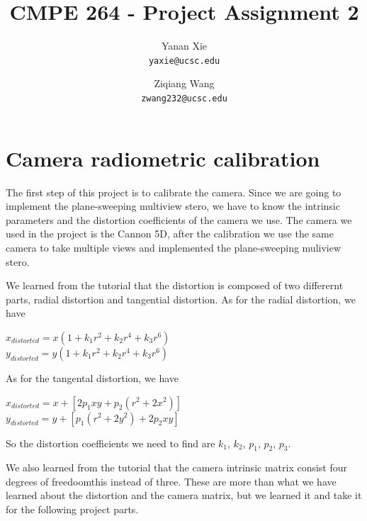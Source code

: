 \documentclass[10pt,twocolumn,letterpaper]{article}
\begin{document}
\title{CMPE 264 - Project Assignment 2}

\author{Yanan Xie\\
{\tt\small yaxie@ucsc.edu}
\and
Ziqiang Wang\\
{\tt\small zwang232@ucsc.edu}
}

\maketitle


\section{Camera radiometric calibration}
The first step of this project is to calibrate the camera. Since we are going to implement the plane-sweeping multiview stero, we have to know the intrinsic parameters and the distortion coefficients of the camera we use. The camera we used in the project is the Cannon 5D, after the calibration we use the same camera to take multiple views and implemented the plane-sweeping muliview stero. 


We learned from the tutorial that the distortion is composed of two differernt parts, radial distortion and tangential distortion. As for the radial distortion, we have 

$x_{distorted} = x(1+k_{1}r^{2}+k_{2}r^{4}+k_{3}r^{6})$\\
$y_{distorted} = y(1+k_{1}r^{2}+k_{2}r^{4}+k_{3}r^{6})$

As for the tangental distortion, we have 

$x_{distorted} = x+[2p_{1}xy+p_{2}(r^{2}+2x^{2})]$\\
$y_{distorted} = y+[p_{1}(r^{2}+2y^{2})+2p_{2}xy]$

So the distortion coefficients we need to find are $k_{1}$, $k_{2}$, $p_{1}$, $p_{2}$, $p_{3}$.

We also learned from the tutorial that the camera intrinsic matrix consist four degrees of freedoomthis instead of three. These are more than what we have learned about the distortion and the camera matrix, but we learned it and take it for the following project parts. 
\end{document}
